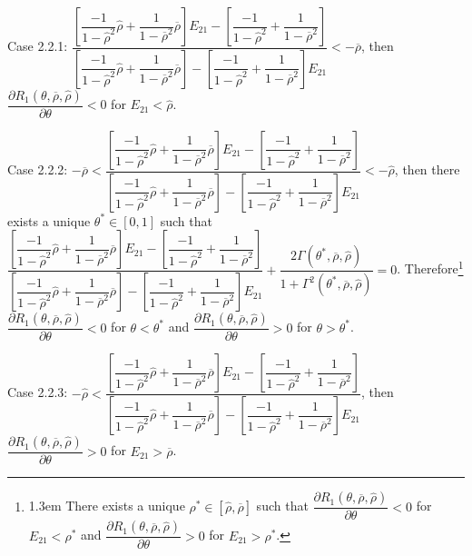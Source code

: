 \documentclass[10pt]{article}
\begin{document}
Case 2.2.1: {\footnotesize $ \dfrac{\left[ \dfrac{- 1}{1 - {\hat \rho}^2} {\hat \rho} + \dfrac1{1 - \overline{\rho}^2} \overline{\rho} \right] E_{2 1} - \left[ \dfrac{- 1}{1 - {\hat \rho}^2} + \dfrac1{1 - \overline{\rho}^2} \right]}{\left[ \dfrac{- 1}{1 - {\hat \rho}^2} {\hat \rho} + \dfrac1{1 - \overline{\rho}^2} \overline{\rho} \right] - \left[ \dfrac{- 1}{1 - {\hat \rho}^2} + \dfrac1{1 - \overline{\rho}^2} \right] E_{2 1}} < - \overline{\rho} $}, then {\footnotesize $ \dfrac{\partial R_1 (\theta, \overline{\rho}, {\hat \rho})}{\partial \theta} < 0 $} for {\footnotesize $ E_{2 1} < \hat{\rho} $}.

Case 2.2.2: {\footnotesize $ - \overline{\rho} < \dfrac{\left[ \dfrac{- 1}{1 - {\hat \rho}^2} {\hat \rho} + \dfrac1{1 - \overline{\rho}^2} \overline{\rho} \right] E_{2 1} - \left[ \dfrac{- 1}{1 - {\hat \rho}^2} + \dfrac1{1 - \overline{\rho}^2} \right]}{\left[ \dfrac{- 1}{1 - {\hat \rho}^2} {\hat \rho} + \dfrac1{1 - \overline{\rho}^2} \overline{\rho} \right] - \left[ \dfrac{- 1}{1 - {\hat \rho}^2} + \dfrac1{1 - \overline{\rho}^2} \right] E_{2 1}} < - \hat{\rho} $}, then there exists a unique {\footnotesize $ \theta^* \in [0, 1] $} such that {\footnotesize $ \dfrac{\left[ \dfrac{- 1}{1 - {\hat \rho}^2} {\hat \rho} + \dfrac1{1 - \overline{\rho}^2} \overline{\rho} \right] E_{2 1} - \left[ \dfrac{- 1}{1 - {\hat \rho}^2} + \dfrac1{1 - \overline{\rho}^2} \right]}{\left[ \dfrac{- 1}{1 - {\hat \rho}^2} {\hat \rho} + \dfrac1{1 - \overline{\rho}^2} \overline{\rho} \right] - \left[ \dfrac{- 1}{1 - {\hat \rho}^2} + \dfrac1{1 - \overline{\rho}^2} \right] E_{2 1}} + \dfrac{2 \Gamma (\theta^*, \overline{\rho}, {\hat \rho})}{1 + \Gamma^2 (\theta^*, \overline{\rho}, {\hat \rho})} = 0 $}. Therefore\footnote{\baselineskip1.3em There exists a unique {\footnotesize $ \rho^* \in [\hat{\rho}, \overline{\rho}] $} such that {\footnotesize $ \dfrac{\partial R_1 (\theta, \overline{\rho}, {\hat \rho})}{\partial \theta} < 0 $} for {\footnotesize $ E_{2 1} < \rho^* $} and {\footnotesize $ \dfrac{\partial R_1 (\theta, \overline{\rho}, {\hat \rho})}{\partial \theta} > 0 $} for {\footnotesize $ E_{2 1} > \rho^* $}.} {\footnotesize $ \dfrac{\partial R_1 (\theta, \overline{\rho}, {\hat \rho})}{\partial \theta} < 0 $} for {\footnotesize $ \theta < \theta^* $} and {\footnotesize $ \dfrac{\partial R_1 (\theta, \overline{\rho}, {\hat \rho})}{\partial \theta} > 0 $} for {\footnotesize $ \theta > \theta^* $}.

Case 2.2.3: {\footnotesize $ - \hat{\rho} < \dfrac{\left[ \dfrac{- 1}{1 - {\hat \rho}^2} {\hat \rho} + \dfrac1{1 - \overline{\rho}^2} \overline{\rho} \right] E_{2 1} - \left[ \dfrac{- 1}{1 - {\hat \rho}^2} + \dfrac1{1 - \overline{\rho}^2} \right]}{\left[ \dfrac{- 1}{1 - {\hat \rho}^2} {\hat \rho} + \dfrac1{1 - \overline{\rho}^2} \overline{\rho} \right] - \left[ \dfrac{- 1}{1 - {\hat \rho}^2} + \dfrac1{1 - \overline{\rho}^2} \right] E_{2 1}} $}, then {\footnotesize $ \dfrac{\partial R_1 (\theta, \overline{\rho}, {\hat \rho})}{\partial \theta} > 0 $} for {\footnotesize $ E_{2 1} > \overline{\rho} $}.
\end{document}
